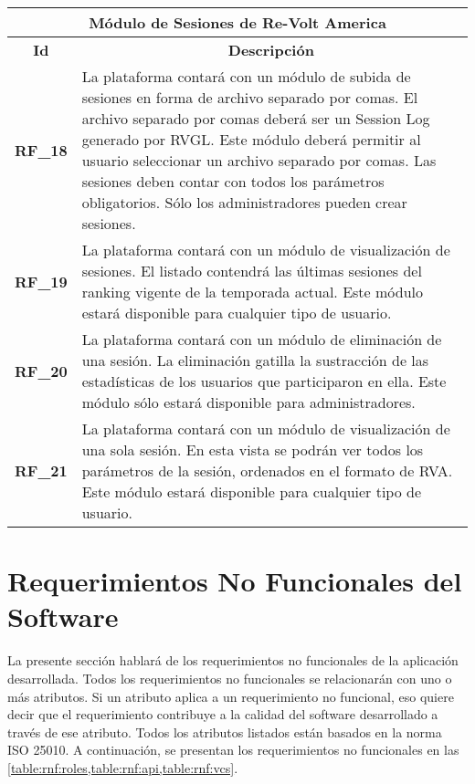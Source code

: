 \begin{center}
	\begin{tabular}{ | l | p{15cm} |}
		\hline
		\multicolumn{2}{|c|}{\textbf{Módulo de Sesiones de Re-Volt America}} \\
		\hline
		\multicolumn{1}{|c|}{\textbf{Id}} & \multicolumn{1}{|c|}{\textbf{Descripción}} \\
		\hline
		{\textbf{RF\_18}} & La plataforma contará con un módulo de subida de sesiones en forma de archivo separado por comas. El archivo separado por comas deberá ser un Session Log generado por RVGL. Este módulo deberá permitir al usuario seleccionar un archivo separado por comas. Las sesiones deben contar con todos los parámetros obligatorios. Sólo los administradores pueden crear sesiones. \\ \hline
		
		{\textbf{RF\_19}} & La plataforma contará con un módulo de visualización de sesiones. El listado contendrá las últimas sesiones del ranking vigente de la temporada actual. Este módulo estará disponible para cualquier tipo de usuario. \\ \hline
		
		{\textbf{RF\_20}} & La plataforma contará con un módulo de eliminación de una sesión. La eliminación gatilla la sustracción de las estadísticas de los usuarios que participaron en ella. Este módulo sólo estará disponible para administradores. \\ \hline
		
		{\textbf{RF\_21}} & La plataforma contará con un módulo de visualización de una sola sesión. En esta vista se podrán ver todos los parámetros de la sesión, ordenados en el formato de RVA. Este módulo estará disponible para cualquier tipo de usuario. \\ \hline
	\end{tabular}
  
  \label{table:rf:sessions}
\end{center}

\section{Requerimientos No Funcionales del Software}
La presente sección hablará de los requerimientos no funcionales de la aplicación desarrollada. Todos los requerimientos no funcionales se relacionarán con uno o más atributos. Si un atributo aplica a un requerimiento no funcional, eso quiere decir que el requerimiento contribuye a la calidad del software desarrollado a través de ese atributo. Todos los atributos listados están basados en la norma ISO 25010. A continuación, se presentan los requerimientos no funcionales en las \cref{table:rnf:roles,table:rnf:api,table:rnf:vcs}.

